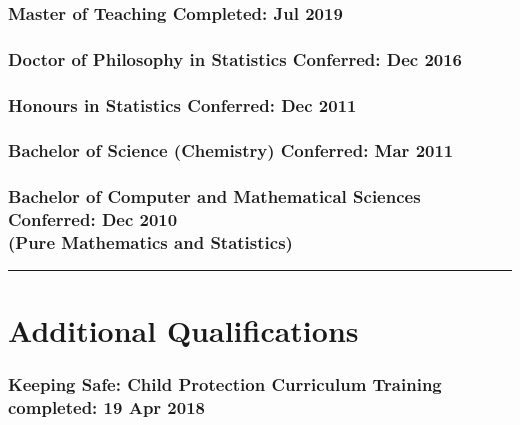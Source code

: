 \documentclass[a4paper,12pt]{report}
\begin{document}
\subsubsection*{Master of Teaching \hfill Completed: Jul 2019}

\subsubsection*{Doctor of Philosophy in Statistics \hfill Conferred: Dec 2016} \vspace{-6pt}

\subsubsection*{Honours in Statistics \hfill Conferred: Dec 2011} \vspace{-6pt}

\subsubsection*{Bachelor of Science (Chemistry) \hfill Conferred: Mar 2011}

\subsubsection*{Bachelor of Computer and Mathematical Sciences \hfill Conferred: Dec 2010 \\ (Pure Mathematics and Statistics)}

\vspace{0.2cm}
\hrule
\vspace{0.5cm}

\section*{Additional Qualifications}


\subsubsection*{Keeping Safe: Child Protection Curriculum Training \hfill completed: 19 Apr 2018}
\end{document}
